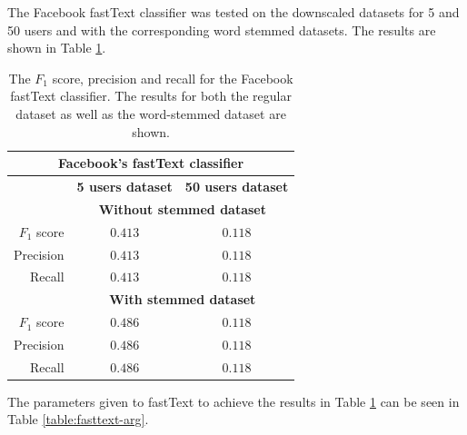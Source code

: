 The Facebook fastText classifier was tested on the downscaled datasets for 5 and 50 users and with the corresponding word stemmed datasets. The results are shown in Table \ref{table:facebook_results}.
\begin{table}[h!]
    \centering
    \begin{tabular}{ r | c | c }
    \multicolumn{3}{c}{\textbf{Facebook's fastText classifier}} \\ \hline
    & \textbf{5 users dataset} & \textbf{50 users dataset} \\ \hline    \hline
    & \multicolumn{2}{c}{\textbf{Without stemmed dataset}} \\ \hline \hline
    $F_1$ score & $0.413$ & $0.118$ \\ \hline
    Precision & $0.413$ & $0.118$ \\ \hline
    Recall & $0.413$ & $0.118$ \\ \hline \hline
    & \multicolumn{2}{c}{\textbf{With stemmed dataset}} \\ \hline \hline
    $F_1$ score & $0.486$ & $0.118$ \\ \hline
    Precision & $0.486$ & $0.118$ \\ \hline
    Recall & $0.486$ & $0.118$ \\ \hline
    \end{tabular}
    \caption{The $F_1$ score, precision and recall for the Facebook fastText classifier. The results for both the regular dataset as well as the word-stemmed dataset are shown.}
    \label{table:facebook_results}
\end{table}

The parameters given to fastText to achieve the results in Table \ref{table:facebook_results} can be seen in Table \ref{table:fasttext-arg}.

